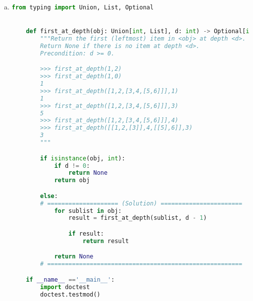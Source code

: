 \documentclass[12pt]{article}
\begin{document}
\begin{enumerate}[a.]
\begin{mdframed}
    \end{mdframed}

    \item

    \begin{lstlisting}[language=python,caption={worksheet\_16\_q2c\_solution.py}]
    from typing import Union, List, Optional


    def first_at_depth(obj: Union[int, List], d: int) -> Optional[int]:
        """Return the first (leftmost) item in <obj> at depth <d>.
        Return None if there is no item at depth <d>.
        Precondition: d >= 0.

        >>> first_at_depth(1,2)
        >>> first_at_depth(1,0)
        1
        >>> first_at_depth([1,2,[3,4,[5,6]]],1)
        1
        >>> first_at_depth([1,2,[3,4,[5,6]]],3)
        5
        >>> first_at_depth([1,2,[3,4,[5,6]]],4)
        >>> first_at_depth([[1,2,[3]],4,[[5],6]],3)
        3
        """

        if isinstance(obj, int):
            if d != 0:
                return None
            return obj

        else:
        # ==================== (Solution) =======================
            for sublist in obj:
                result = first_at_depth(sublist, d - 1)

                if result:
                    return result

            return None
        # =======================================================

    if __name__ =='__main__':
        import doctest
        doctest.testmod()
    \end{lstlisting}
\end{enumerate}
\end{document}
